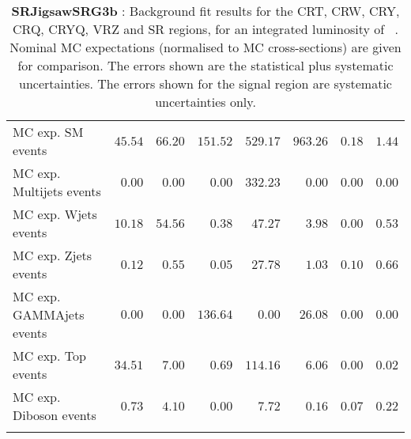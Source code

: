 \begin{table}
\begin{center}
{\begin{tabular*}{\textwidth}{@{\extracolsep{\fill}}lrrrrrrr}
 \noalign{\smallskip}\hline\noalign{\smallskip}
MC exp. SM events              & $45.54$          & $66.20$          & $151.52$          & $529.17$          & $963.26$          & $0.18$          & $1.44$              \\
\noalign{\smallskip}\hline\noalign{\smallskip}
        MC exp. Multijets events         & $0.00$          & $0.00$          & $0.00$          & $332.23$          & $0.00$          & $0.00$          & $0.00$              \\
        MC exp. Wjets events         & $10.18$          & $54.56$          & $0.38$          & $47.27$          & $3.98$          & $0.00$          & $0.53$              \\
        MC exp. Zjets events         & $0.12$          & $0.55$          & $0.05$          & $27.78$          & $1.03$          & $0.10$          & $0.66$              \\
        MC exp. GAMMAjets events         & $0.00$          & $0.00$          & $136.64$          & $0.00$          & $26.08$          & $0.00$          & $0.00$              \\
        MC exp. Top events         & $34.51$          & $7.00$          & $0.69$          & $114.16$          & $6.06$          & $0.00$          & $0.02$              \\
        MC exp. Diboson events         & $0.73$          & $4.10$          & $0.00$          & $7.72$          & $0.16$          & $0.07$          & $0.22$              \\
\noalign{\smallskip}\hline\noalign{\smallskip}
\end{tabular*}
}
\end{center}
\caption{{\bf SRJigsawSRG3b} : Background fit results for the CRT, CRW, CRY, CRQ, CRYQ, VRZ and SR regions, for an integrated luminosity of \ourintlumi~\ifb. Nominal MC expectations (normalised to MC cross-sections) are given for comparison. The errors shown are the statistical plus systematic uncertainties. The errors shown for the signal region are systematic uncertainties only.}
\label{table.results.systematics.in.logL.fit.CRT.CRW.CRY.CRQ.CRYQ.VRZ.SR.SRJigsawSRG3b}
\end{table}
%